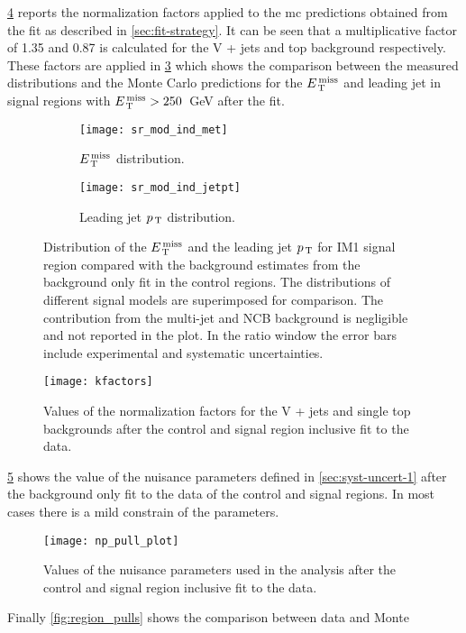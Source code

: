 \cref{fig:kfactors} reports the normalization factors applied to the \gls{mc}
predictions obtained from the fit as described in \cref{sec:fit-strategy}. It
can be seen that a multiplicative factor of 1.35 and 0.87 is calculated for the
V + jets and top background respectively. These factors are applied in
\cref{fig:sr_plots} which shows the comparison between the measured
distributions and the Monte Carlo predictions for the $E_\mathrm{\, T}^\mathrm{\, miss}$ and leading jet in
signal regions with $E_\mathrm{\, T}^\mathrm{\, miss} > 250$~GeV after the fit.
\begin{figure}[!h]
  \centering
  \begin{subfigure}[t]{.48\linewidth}
    \texttt{[image: sr\_mod\_ind\_met]}
    \caption{$E_\mathrm{\, T}^\mathrm{\, miss}$ distribution.}
    \label{fig:sr_et_miss}
  \end{subfigure}
  \begin{subfigure}[t]{.48\linewidth}
    \texttt{[image: sr\_mod\_ind\_jetpt]}
    \caption{Leading jet $p_\mathrm{\, T}$ distribution.}
    \label{fig:sr_jet1_pt}
  \end{subfigure}
  \caption{Distribution of the $E_\mathrm{\, T}^\mathrm{\, miss}$ and the leading jet $p_\mathrm{\, T}$ for IM1 signal
    region compared with the background estimates from the background only fit
    in the control regions. The distributions of different signal models are
    superimposed for comparison. The contribution from the multi-jet and NCB
    background is negligible and not reported in the plot. In the ratio window
    the error bars include experimental and systematic uncertainties.}
  \label{fig:sr_plots}
\end{figure}
\begin{figure}[!h]
  \centering
  \texttt{[image: kfactors]}
  \caption{Values of the normalization factors for the V + jets and single top
    backgrounds after the control and signal region inclusive fit to the data.}
  \label{fig:kfactors}
\end{figure}
\cref{fig:np_pull} shows the value of the nuisance parameters defined in
\cref{sec:syst-uncert-1} after the background only fit to the data of the
control and signal regions. In most cases there is a mild constrain of the
parameters.
\begin{figure}[!h]
  \centering
  \texttt{[image: np\_pull\_plot]}
  \caption{Values of the nuisance parameters used in the analysis after the
    control and signal region inclusive fit to the data.}
  \label{fig:np_pull}
\end{figure}
Finally \cref{fig:region_pulls} shows the comparison between data and Monte
